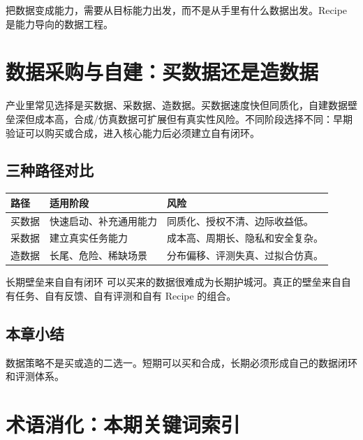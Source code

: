 \documentclass[a4paper]{article}
\begin{document}
把数据变成能力，需要从目标能力出发，而不是从手里有什么数据出发。Recipe 是能力导向的数据工程。

\section{数据采购与自建：买数据还是造数据}

产业里常见选择是买数据、采数据、造数据。买数据速度快但同质化，自建数据壁垒深但成本高，合成/仿真数据可扩展但有真实性风险。不同阶段选择不同：早期验证可以购买或合成，进入核心能力后必须建立自有闭环。

\subsection{三种路径对比}

\noindent\begin{tabularx}{\textwidth}{p{}p{}X}
\toprule
路径 & 适用阶段 & 风险 \\
\midrule
买数据 & 快速启动、补充通用能力 & 同质化、授权不清、边际收益低。 \\
采数据 & 建立真实任务能力 & 成本高、周期长、隐私和安全复杂。 \\
造数据 & 长尾、危险、稀缺场景 & 分布偏移、评测失真、过拟合仿真。 \\
\bottomrule
\end{tabularx}

\begin{importantbox}{长期壁垒来自自有闭环}
可以买来的数据很难成为长期护城河。真正的壁垒来自自有任务、自有反馈、自有评测和自有 Recipe 的组合。
\end{importantbox}

\subsection{本章小结}

数据策略不是买或造的二选一。短期可以买和合成，长期必须形成自己的数据闭环和评测体系。

\section{术语消化：本期关键词索引}
\end{document}
